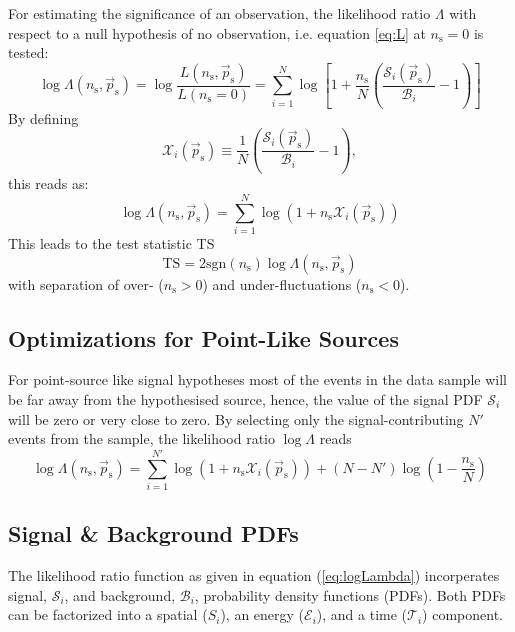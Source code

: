 \documentclass{article}
\newcommand{\eq}[1]{(\ref{#1})}
\newcommand{\ns}{n_{\mathrm{s}}}
\newcommand{\ps}{\vec{p}_{\mathrm{s}}}
\begin{document}
For estimating the significance of an observation, the likelihood ratio
$\Lambda$ with respect to a null hypothesis of no observation, i.e.
equation \ref{eq:L} at $\ns=0$ is tested:
\begin{equation}
 \log \Lambda(\ns,\ps) = \log \frac{L(\ns,\ps)}{L(\ns=0)} = \sum_{i=1}^{N} \log \left[ 1 + \frac{\ns}{N}\left( \frac{\mathcal{S}_i(\ps)}{\mathcal{B}_i} - 1 \right) \right]
\label{eq:logLambda}
\end{equation}
By defining
\begin{equation}
\mathcal{X}_i(\ps) \equiv \frac{1}{N}\left( \frac{\mathcal{S}_i(\ps)}{\mathcal{B}_i} - 1 \right),
\label{eq:Xi}
\end{equation}
this reads as:
\begin{equation}
 \log \Lambda(\ns,\ps) = \sum_{i=1}^{N} \log (1 + \ns\mathcal{X}_i(\ps))
 \label{eq:logLambdaOfX}
\end{equation}
This leads to the test statistic TS
\begin{equation}
 \mathrm{TS} = 2\mathrm{sgn}(\ns) \log \Lambda(\ns,\ps)
 \label{eq:TS}
\end{equation}
with separation of over- ($\ns > 0$) and under-fluctuations ($\ns < 0$).

\subsection{Optimizations for Point-Like Sources}

For point-source like signal hypotheses most of the events in the data sample
will be far away from the hypothesised source, hence, the value of the
signal PDF $\mathcal{S}_i$ will be zero or very close to zero. By selecting only
the signal-contributing $N'$ events from the sample, the likelihood ratio
$\log \Lambda$ reads
\begin{equation}
 \log \Lambda(\ns,\ps) = \sum_{i=1}^{N'} \log(1 + \ns\mathcal{X}_i(\ps)) + (N - N')\log(1 - \frac{\ns}{N})
 \label{eq:logLambdaOfXOptimized}
\end{equation}


\subsection{Signal \& Background PDFs}

The likelihood ratio function as given in equation \eq{eq:logLambda}
incorperates signal, $\mathcal{S}_i$, and background, $\mathcal{B}_i$,
probability density functions (PDFs). Both PDFs can be factorized into a
spatial ($S_i$), an energy ($\mathcal{E}_i$), and a time ($\mathcal{T}_i$)
component.
\end{document}
